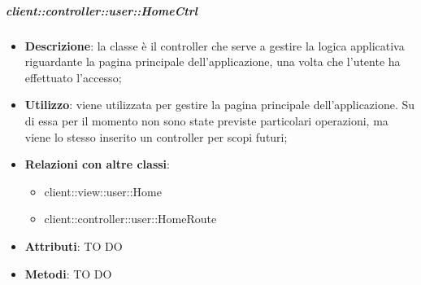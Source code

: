 		\subparagraph{client::controller::user::HomeCtrl} %
		\label{subp:client_controller_user_homectrl}
			\begin{itemize}
				\item \textbf{Descrizione}: la classe è il controller che serve a gestire la logica applicativa riguardante la pagina principale dell'applicazione, una volta che l'utente ha effettuato l'accesso;
				\item \textbf{Utilizzo}: viene utilizzata per gestire la pagina principale dell'applicazione. Su di essa per il momento non sono state previste particolari operazioni, ma viene lo stesso inserito un controller per scopi futuri;
				\item \textbf{Relazioni con altre classi}:
					\begin{itemize}
						\item client::view::user::Home
						\item client::controller::user::HomeRoute
					\end{itemize}
				\item \textbf{Attributi}: TO DO
				\item \textbf{Metodi}: TO DO
			\end{itemize}

